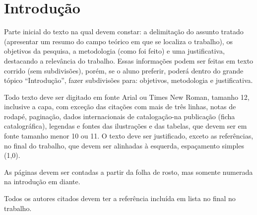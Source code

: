 \chapter{Introdução}

Parte inicial do texto na qual devem constar: a delimitação do assunto tratado (apresentar um resumo do campo teórico em que se localiza o trabalho), os objetivos da pesquisa, a metodologia (como foi feito) e uma justificativa, destacando a relevância do trabalho. Essas informações podem ser feitas em texto corrido (sem subdivisões), porém, se o aluno preferir, poderá dentro do grande tópico “Introdução”, fazer subdivisões para: objetivos, metodologia e justificativa. 

Todo texto deve ser digitado em fonte Arial ou Times New Roman, tamanho 12, inclusive a capa, com exceção das citações com mais de três linhas, notas de rodapé, paginação, dados internacionais de catalogação-na publicação (ficha catalográfica), legendas e fontes das ilustrações e das tabelas, que devem ser em fonte tamanho menor 10 ou 11. O texto deve ser justificado, exceto as referências, no final do trabalho, que devem ser alinhadas à esquerda, espaçamento simples (1,0). 

As páginas devem ser contadas a partir da folha de rosto, mas somente numerada na introdução em diante. 

Todos os autores citados devem ter a referência incluída em lista no final no trabalho. \cite{de2011associaccao}

